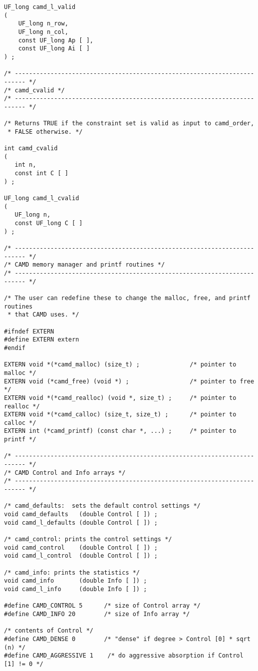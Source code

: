 \documentclass[11pt]{article}
\begin{document}
{\begin{verbatim}
UF_long camd_l_valid
(
    UF_long n_row,
    UF_long n_col,
    const UF_long Ap [ ],
    const UF_long Ai [ ]
) ;

/* ------------------------------------------------------------------------- */
/* camd_cvalid */
/* ------------------------------------------------------------------------- */

/* Returns TRUE if the constraint set is valid as input to camd_order,
 * FALSE otherwise. */

int camd_cvalid
(
   int n,
   const int C [ ]
) ;

UF_long camd_l_cvalid
(
   UF_long n,
   const UF_long C [ ]
) ;

/* ------------------------------------------------------------------------- */
/* CAMD memory manager and printf routines */
/* ------------------------------------------------------------------------- */

/* The user can redefine these to change the malloc, free, and printf routines
 * that CAMD uses. */

#ifndef EXTERN
#define EXTERN extern
#endif

EXTERN void *(*camd_malloc) (size_t) ;              /* pointer to malloc */
EXTERN void (*camd_free) (void *) ;                 /* pointer to free */
EXTERN void *(*camd_realloc) (void *, size_t) ;     /* pointer to realloc */
EXTERN void *(*camd_calloc) (size_t, size_t) ;      /* pointer to calloc */
EXTERN int (*camd_printf) (const char *, ...) ;     /* pointer to printf */

/* ------------------------------------------------------------------------- */
/* CAMD Control and Info arrays */
/* ------------------------------------------------------------------------- */

/* camd_defaults:  sets the default control settings */
void camd_defaults   (double Control [ ]) ;
void camd_l_defaults (double Control [ ]) ;

/* camd_control: prints the control settings */
void camd_control    (double Control [ ]) ;
void camd_l_control  (double Control [ ]) ;

/* camd_info: prints the statistics */
void camd_info       (double Info [ ]) ;
void camd_l_info     (double Info [ ]) ;

#define CAMD_CONTROL 5      /* size of Control array */
#define CAMD_INFO 20        /* size of Info array */

/* contents of Control */
#define CAMD_DENSE 0        /* "dense" if degree > Control [0] * sqrt (n) */
#define CAMD_AGGRESSIVE 1    /* do aggressive absorption if Control [1] != 0 */


\end{verbatim}}
\end{document}
